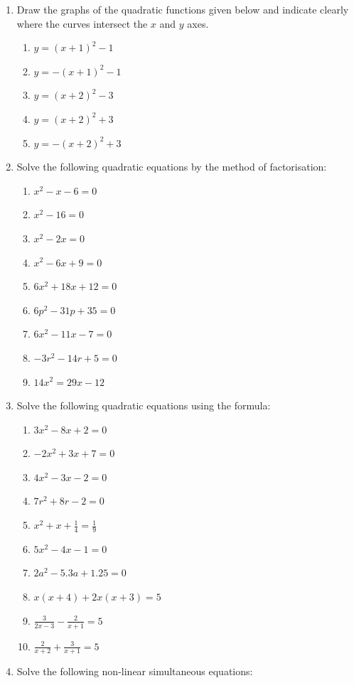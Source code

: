\documentclass[
  12pt,
  oneside]{book}
\providecommand{\tightlist}{%
  \setlength{\itemsep}{0pt}\setlength{\parskip}{0pt}}
\theoremstyle{definition}
\theoremstyle{definition}
\theoremstyle{definition}
\theoremstyle{definition}
\theoremstyle{remark}
\begin{document}
\begin{enumerate}
\def\labelenumi{\arabic{enumi}.}
\item
  Draw the graphs of the quadratic functions given below and indicate clearly where the curves intersect the \(x\) and \(y\) axes.

  \begin{enumerate}
  \def\labelenumii{\roman{enumii})}
  \tightlist
  \item
    \(y=(x+1)^2-1\)
  \item
    \(y=-(x+1)^2-1\)
  \item
    \(y=(x+2)^2-3\)
  \item
    \(y=(x+2)^2+3\)
  \item
    \(y=-(x+2)^2+3\)
  \end{enumerate}
\item
  Solve the following quadratic equations by the method of factorisation:

  \begin{enumerate}
  \def\labelenumii{\roman{enumii})}
  \tightlist
  \item
    \(x^2-x-6=0\)
  \item
    \(x^2-16=0\)
  \item
    \(x^2-2x=0\)
  \item
    \(x^2-6x+9=0\)
  \item
    \(6x^2+18x+12=0\)
  \item
    \(6p^2-31p+35=0\)
  \item
    \(6x^2-11x-7=0\)
  \item
    \(-3r^2-14r+5=0\)
  \item
    \(14x^2=29x-12\)
  \end{enumerate}
\item
  Solve the following quadratic equations using the formula:

  \begin{enumerate}
  \def\labelenumii{\roman{enumii})}
  \tightlist
  \item
    \(3x^2-8x+2=0\)
  \item
    \(-2x^2+3x+7=0\)
  \item
    \(4x^2-3x-2=0\)
  \item
    \(7r^2+8r-2=0\)
  \item
    \(x^2+x+\frac14=\frac19\)
  \item
    \(5x^2-4x-1=0\)
  \item
    \(2a^2-5.3a+1.25=0\)
  \item
    \(x(x+4)+2x(x+3)=5\)
  \item
    \(\frac{3}{2x-3}-\frac{2}{x+1}=5\)
  \item
    \(\frac{2}{x+2}+\frac{3}{x+1}=5\)
  \end{enumerate}
\item
  Solve the following non-linear simultaneous equations:


\end{enumerate}
\end{document}
